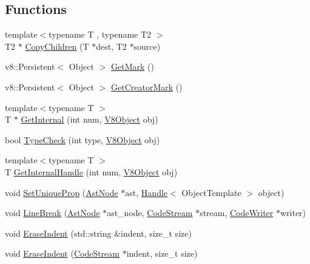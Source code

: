 \subsection*{Functions}
\begin{DoxyCompactItemize}
\item 
{\footnotesize template$<$typename T , typename T2 $>$ }\\T2 $\ast$ \hyperlink{namespacemocha_a79ee75d825bd12aef121c19925082a1b}{CopyChildren} (T $\ast$dest, T2 $\ast$source)
\item 
v8::Persistent$<$ Object $>$ \hyperlink{namespacemocha_aa3601132fe6d68ee544dfdefd24c4d77}{GetMark} ()
\item 
v8::Persistent$<$ Object $>$ \hyperlink{namespacemocha_ae698971194d69223459539c3070dcdac}{GetCreatorMark} ()
\item 
{\footnotesize template$<$typename T $>$ }\\T $\ast$ \hyperlink{namespacemocha_addb5abd40c2d91b7abe2efb219219170}{GetInternal} (int num, \hyperlink{namespacemocha_ab7457ad2b98f5878f68f21f2c916ffb9}{V8Object} obj)
\item 
bool \hyperlink{namespacemocha_aeaba8702c2f94037a2e96776dd9838aa}{TypeCheck} (int type, \hyperlink{namespacemocha_ab7457ad2b98f5878f68f21f2c916ffb9}{V8Object} obj)
\item 
{\footnotesize template$<$typename T $>$ }\\T \hyperlink{namespacemocha_aadd32983aa0ed1135c168f6e85beb5ac}{GetInternalHandle} (int num, \hyperlink{namespacemocha_ab7457ad2b98f5878f68f21f2c916ffb9}{V8Object} obj)
\item 
void \hyperlink{namespacemocha_ad2c0f20efbd87c39a19eec72ee7dc24f}{SetUniqueProp} (\hyperlink{classmocha_1_1_ast_node}{AstNode} $\ast$ast, \hyperlink{classmocha_1_1_handle}{Handle}$<$ ObjectTemplate $>$ object)
\item 
void \hyperlink{namespacemocha_ac9dbc6b0070db68d84e78e65d788c4b2}{LineBreak} (\hyperlink{classmocha_1_1_ast_node}{AstNode} $\ast$ast\_\-node, \hyperlink{classmocha_1_1_code_stream}{CodeStream} $\ast$stream, \hyperlink{classmocha_1_1_code_writer}{CodeWriter} $\ast$writer)
\item 
void \hyperlink{namespacemocha_a595436a22b63eaab2d5e2a96465adab5}{EraseIndent} (std::string \&indent, size\_\-t size)
\item 
void \hyperlink{namespacemocha_a990f5a67b621736a11dc2a3e9676e86e}{EraseIndent} (\hyperlink{classmocha_1_1_code_stream}{CodeStream} $\ast$indent, size\_\-t size)
\item 

\end{DoxyCompactItemize}
